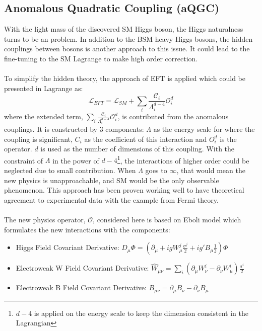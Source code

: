 \subsection{Anomalous Quadratic Coupling (aQGC)}
With the light mass of the discovered SM Higgs boson, the Higgs naturalness turns to be an problem. In addition to the BSM heavy Higgs bosons, the hidden couplings between bosons is another approach to this issue. It could lead to the fine-tuning to the SM Lagrange to make high order correction. 
\\
\\To simplify the hidden theory, the approach of EFT is applied which could be presented in Lagrange as:
\begin{equation}
\mathcal{L}_{EFT} = \mathcal{L}_{SM} + \sum_{i}\frac{\mathcal{C}_i}{\Lambda_{i}^{d-4}}\mathcal{O}^{d}_{i}
\end{equation}
where the extended term, $\sum_{i}\frac{\mathcal{C}_i}{\Lambda_{i}^{d-4}}\mathcal{O}^{d}_{i}$, is contributed from the anomalous couplings. It is constructed by 3 components: $\Lambda$ as the energy scale for where the coupling is significant, $C_{i}$ as the coefficient of this interaction and $O^{d}_i$ is the operator. $d$ is used as the number of dimensions of this coupling. With the constraint of $\Lambda$ in the power of $d-4$\footnote{$d-4$ is applied on the energy scale to keep the dimension consistent in the Lagrangian}, the interactions of higher order could be neglected due to small contribution. When $\Lambda$ goes to $\infty$, that would mean the new physics is unapproachable, and SM would be the only observable phenomenon. This approach has been proven working well to have theoretical agreement to experimental data with the example from Fermi theory. 
\\
\\The new physics operator, $\mathcal{O}$, considered here is based on Eboli model which formulates the new interactions with the components:
\begin{itemize}
	\item{Higgs Field Covariant Derivative}: $D_{\mu}\Phi =(\partial_\mu + igW^j_{\mu}\frac{\sigma^{j}}{2}+ig'B_\mu\frac{1}{2})\Phi $
	\item{Electroweak W Field Covariant Derivative}: $\hat{W}_{\mu\nu}=\sum_{i}(\partial_\mu W_\nu^i - \partial_\nu W_\mu^i)\frac{\sigma^i}{2}$
	\item{Electroweak B Field Covariant Derivative}: $B_{\mu\nu} = \partial_\mu B_\nu - \partial_\nu B_\mu$
\end{itemize}
